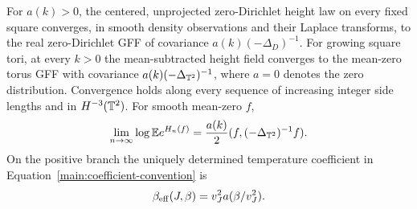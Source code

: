 \begin{theorem}\label{an:dirichlet-torus}
For $a(k)>0$, the centered, unprojected zero-Dirichlet height law
on every fixed square converges, in smooth density observations
and their Laplace transforms, to the real zero-Dirichlet GFF of
covariance $a(k)(-\Delta_D)^{-1}$.  For growing square tori, at
every $k>0$ the mean-subtracted height field converges to the
mean-zero torus GFF with covariance $a(k)(-\Delta_{\mathbb T^2})^{-1}$,
where $a=0$ denotes the zero distribution.  Convergence holds
along every sequence of increasing integer side lengths and in
$H^{-3}(\mathbb T^2)$.  For smooth mean-zero $f$,
\begin{equation}
 \lim_{n\to\infty}\log\mathbb E e^{H_n(f)}
     =\frac{a(k)}2(f,(-\Delta_{\mathbb T^2})^{-1}f).
 \label{an:torus-laplace}
\end{equation}
On the positive branch the uniquely determined temperature
coefficient in Equation~\eqref{main:coefficient-convention} is
\begin{equation}
 \beta_{\mathrm{eff}}(J,\beta)=v_J^2a(\beta/v_J^2).
 \label{an:effective-temperature}
\end{equation}
\end{theorem}

